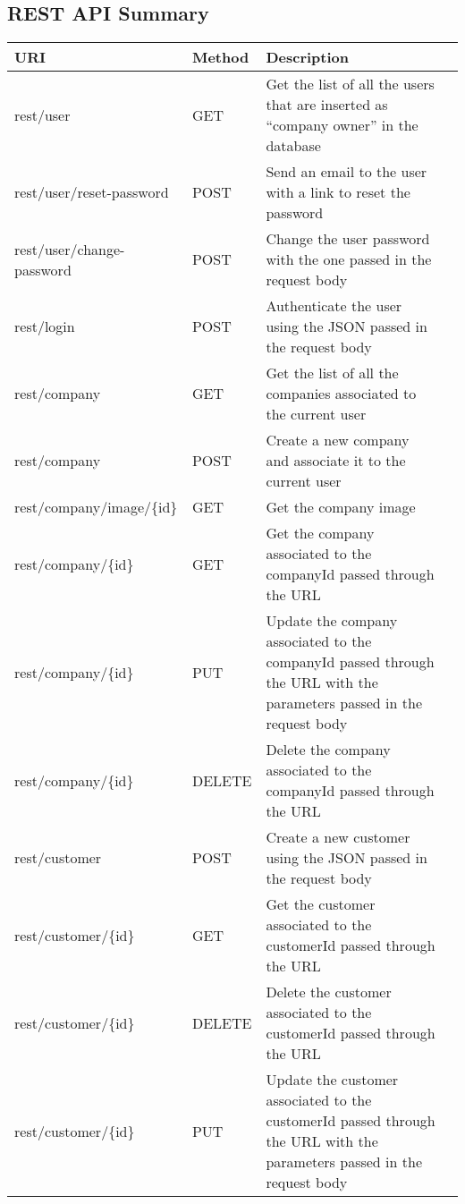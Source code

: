 \subsection{REST API Summary}


\begin{longtable}{|p{}|p{} |p{}|p{}|} 
\hline
\textbf{URI} & \textbf{Method} & \textbf{Description} \\\hline
rest/user & GET & Get the list of all the users that are inserted as ``company owner'' in the database \\\hline
rest/user/reset-password & POST & Send an email to the user with a link to reset the password \\\hline
rest/user/change-password & POST & Change the user password with the one passed in the request body \\\hline
rest/login & POST & Authenticate the user using the JSON passed in the request body\\\hline
rest/company & GET & Get the list of all the companies associated to the current user \\\hline
rest/company & POST & Create a new company and associate it to the current user \\\hline
rest/company/image/\{id\} & GET & Get the company image \\\hline
rest/company/\{id\} & GET & Get the company associated to the companyId passed through the URL \\\hline
rest/company/\{id\} & PUT & Update the company associated to the companyId passed through the URL with the parameters passed in the request body \\\hline
rest/company/\{id\} & DELETE & Delete the company associated to the companyId passed through the URL \\\hline
rest/customer & POST & Create a new customer using the JSON passed in the request body \\\hline
rest/customer/\{id\} & GET & Get the customer associated to the customerId passed through the URL \\\hline
rest/customer/\{id\} & DELETE & Delete the customer associated to the customerId passed through the URL \\\hline
rest/customer/\{id\} & PUT & Update the customer associated to the customerId passed through the URL with the parameters passed in the request body\\\hline

\end{longtable}
